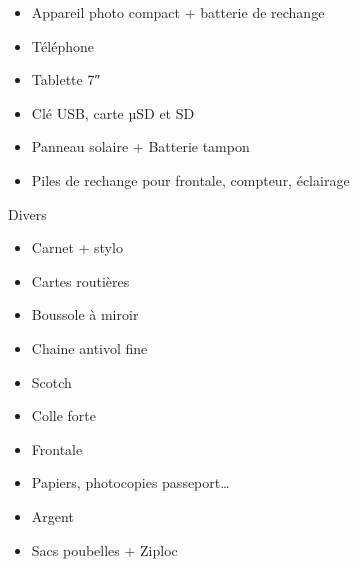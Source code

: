  \begin{itemize}
 \item Appareil photo compact + batterie de rechange
 \item Téléphone
 \item Tablette 7″
 \item Clé USB, carte µSD et SD
 \item Panneau solaire + Batterie tampon
 \item Piles de rechange pour frontale, compteur, éclairage
 \end{itemize}
 Divers

 \begin{itemize}
 \item Carnet + stylo
 \item Cartes routières
 \item Boussole à miroir
 \item Chaine antivol fine
 \item Scotch
 \item Colle forte
 \item Frontale
 \item Papiers, photocopies passeport…
 \item Argent
 \item Sacs poubelles + Ziploc
 \end{itemize}
 


 
 
